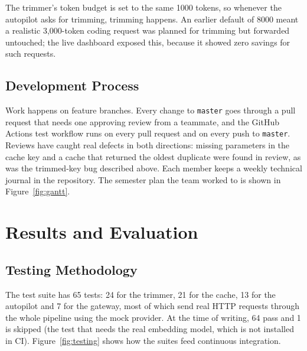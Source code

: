\documentclass[12pt, a4paper, oneside]{report}
\newcommand{\code}[1]{\texttt{#1}}
\begin{document}
The trimmer's token budget is set to the same 1000 tokens, so whenever the
autopilot asks for trimming, trimming happens. An earlier default of 8000 meant a
realistic 3,000-token coding request was planned for trimming but forwarded
untouched; the live dashboard exposed this, because it showed zero savings for
such requests.

\section{Development Process}

Work happens on feature branches. Every change to \code{master} goes through a pull
request that needs one approving review from a teammate, and the GitHub Actions
test workflow runs on every pull request and on
every push to \code{master}. Reviews have caught real defects in both
directions: missing parameters in the cache key and a cache that returned the
oldest duplicate were found in review, as was the trimmed-key bug described above.
Each member keeps a weekly technical journal in the repository. The
semester plan the team worked to is shown in Figure~\ref{fig:gantt}.




\chapter{Results and Evaluation}

\section{Testing Methodology}

The test suite has 65 tests: 24 for the trimmer, 21 for the cache, 13 for the
autopilot and 7 for the gateway, most of which send real HTTP requests through the
whole pipeline using the mock provider. At the time of writing, 64 pass and 1 is skipped
(the test that needs the real embedding model, which is not installed in CI).
Figure~\ref{fig:testing} shows how the suites feed continuous integration.
\end{document}
